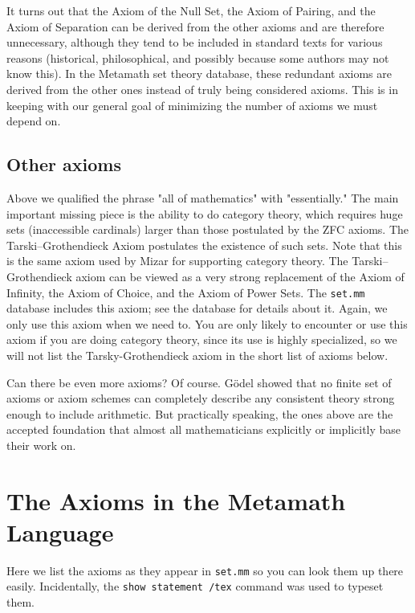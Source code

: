 It turns out that the Axiom of the Null Set, the Axiom of Pairing, and the
Axiom of Separation can be derived from the other axioms and are therefore
unnecessary, although they tend to be included in standard texts for various
reasons (historical, philosophical, and possibly because some authors may not
know this).  In the Metamath set theory database, these
redundant axioms are derived from the other ones instead of truly
being considered axioms.
This is in keeping with our general goal of minimizing the number of
axioms we must depend on.

\subsection{Other axioms}

Above we qualified the phrase "all of mathematics" with "essentially."
The main important missing piece is the ability to do category theory,
which requires huge sets (inaccessible cardinals) larger than those
postulated by the ZFC axioms. The Tarski--Grothendieck Axiom postulates
the existence of such sets.
Note that this is the same axiom used by Mizar for supporting
category theory.
The Tarski--Grothendieck axiom
can be viewed as a very strong replacement of the Axiom of Infinity,
the Axiom of Choice, and the Axiom of Power Sets.
The \texttt{set.mm} database includes this axiom; see the database
for details about it.
Again, we only use this axiom when we need to.
You are only likely to encounter or use this axiom if you are doing
category theory, since its use is highly specialized,
so we will not list the Tarsky-Grothendieck axiom
in the short list of axioms below.

Can there be even more axioms?
Of course.
G\"{o}del showed that no finite set of axioms or axiom schemes can completely
describe any consistent theory strong enough to include arithmetic.
But practically speaking, the ones above are the accepted foundation that
almost all mathematicians explicitly or implicitly base their work on.

\section{The Axioms in the Metamath Language}\label{metaaxioms}

Here we list the axioms as they appear in
\texttt{set.mm} so you can
look them up there easily.  Incidentally, the \texttt{show statement
/tex} command was used to
typeset them.


